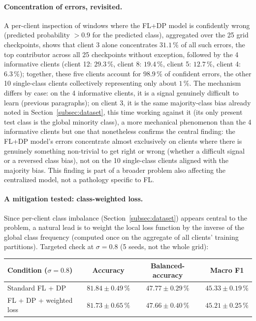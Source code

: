 \documentclass{article}
\begin{document}
\paragraph{Concentration of errors, revisited.} A per-client inspection of
windows where the FL+DP model is confidently wrong (predicted probability
$>0.9$ for the predicted class), aggregated over the 25 grid checkpoints, shows
that client 3 alone concentrates $31.1\,\%$ of all such errors, the top
contributor across all 25 checkpoints without exception, followed by the 4
informative clients (client 12: $29.3\,\%$, client 8: $19.4\,\%$, client 5:
$12.7\,\%$, client 4: $6.3\,\%$); together, these five clients account for
$98.9\,\%$ of confident errors, the other 10 single-class clients collectively
representing only about $1\,\%$. The mechanism differs by case: on the 4
informative clients, it is a signal genuinely difficult to learn (previous
paragraphs); on client 3, it is the same majority-class bias already noted in
Section~\ref{subsec:dataset}, this time working against it (its only present
test class is the global minority class), a more mechanical phenomenon than the
4 informative clients but one that nonetheless confirms the central finding: the
FL+DP model's errors concentrate almost exclusively on clients where there is
genuinely something non-trivial to get right or wrong (whether a difficult
signal or a reversed class bias), not on the 10 single-class clients aligned
with the majority bias. This finding is part of a broader problem also affecting
the centralized model, not a pathology specific to FL.

\paragraph{A mitigation tested: class-weighted loss.} Since per-client class
imbalance (Section~\ref{subsec:dataset}) appears central to the problem, a
natural lead is to weight the local loss function by the inverse of the global
class frequency (computed once on the aggregate of all clients' training
partitions). Targeted check at $\sigma=0.8$ (5 seeds, not the whole grid):

\begin{center}
\begin{tabular}{lccc}
  \toprule
  Condition ($\sigma=0.8$) & Accuracy & Balanced-accuracy & Macro F1 \\
  \midrule
  Standard FL + DP        & $81.84 \pm 0.49\,\%$ & $47.77 \pm 0.29\,\%$ & $45.33 \pm 0.19\,\%$ \\
  FL + DP + weighted loss & $81.73 \pm 0.65\,\%$ & $47.66 \pm 0.40\,\%$ & $45.21 \pm 0.25\,\%$ \\
  \bottomrule
\end{tabular}
\end{center}
\end{document}
